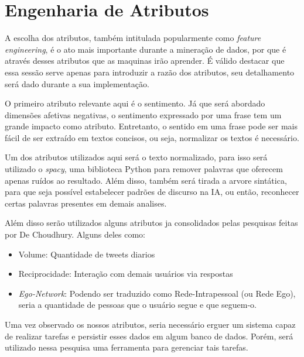 \section{Engenharia de Atributos}
A escolha dos atributos, também intitulada popularmente como \textit{feature engineering}, é o ato mais importante durante a mineração de dados, por que é através desses atributos que as maquinas irão aprender. É válido destacar que essa sessão serve apenas para introduzir a razão dos atributos, seu detalhamento será dado durante a sua implementação.

O primeiro atributo relevante aqui é o sentimento. Já que será abordado dimensões afetivas negativas, o sentimento expressado por uma frase tem um grande impacto como atributo. Entretanto, o sentido em uma frase pode ser mais fácil de ser extraído em textos concisos, ou seja, normalizar os textos é necessário.

Um dos atributos utilizados aqui será o texto normalizado, para isso será utilizado o \textit{spacy}, uma biblioteca Python para remover palavras que oferecem apenas ruídos ao resultado. Além disso, também será tirada a arvore sintática, para que seja possível estabelecer padrões de discurso na IA, ou então, reconhecer certas palavras presentes em demais analises.

Além disso serão utilizados alguns atributos ja consolidados pelas pesquisas feitas por De Choudhury\cite{de2013social, de2013predicting}. Alguns deles como:
\begin{itemize}
 \item Volume: Quantidade de tweets diarios
 \item Reciprocidade: Interação com demais usuários via respostas
 \item \textit{Ego-Network}: Podendo ser traduzido como Rede-Intrapessoal (ou Rede Ego), seria a quantidade de pessoas que o usuário segue e que seguem-o.
\end{itemize}

Uma vez observado os nossos atributos, seria necessário erguer um sistema capaz de realizar tarefas e persistir esses dados em algum banco de dados. Porém, será utilizado nessa pesquisa uma ferramenta para gerenciar tais tarefas.
